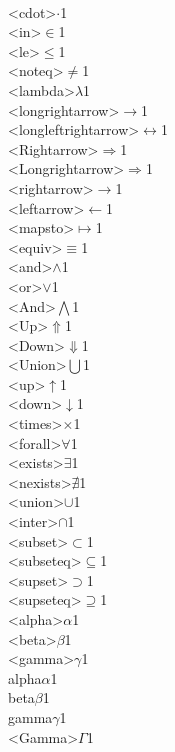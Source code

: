 {  {\\<cdot>}{{$\cdot$}}1
  {\\<in>}{{$\in$}}1
  {\\<le>}{{$\le$}}1
  {\\<noteq>}{{$\ne$}}1
  {\\<lambda>}{{$\lambda$}}1
  {\\<longrightarrow>}{{$\longrightarrow$}}1
  {\\<longleftrightarrow>}{{$\longleftrightarrow$}}1
  {\\<Rightarrow>}{{$\Rightarrow$}}1
  {\\<Longrightarrow>}{{$\Longrightarrow$}}1
  {\\<rightarrow>}{{$\rightarrow$}}1
  {\\<leftarrow>}{{$\leftarrow$}}1
  {\\<mapsto>}{{$\mapsto$}}1
  {\\<equiv>}{{$\equiv$}}1
  {\\<and>}{{$\wedge$}}1
  {\\<or>}{{$\vee$}}1
  {\\<And>}{{$\bigwedge$}}1
  {\\<Up>}{{$\Uparrow$}}1
  {\\<Down>}{{$\Downarrow$}}1
  {\\<Union>}{{$\bigcup$}}1
  {\\<up>}{{$\uparrow$}}1
  {\\<down>}{{$\downarrow$}}1
  {\\<times>}{{$\times$}}1
  {\\<forall>}{{$\forall$}}1
  {\\<exists>}{{$\exists$}}1
  {\\<nexists>}{{$\nexists$}}1
  {\\<union>}{{$\cup$}}1
  {\\<inter>}{{$\cap$}}1
  {\\<subset>}{{$\subset$}}1
  {\\<subseteq>}{{$\subseteq$}}1
  {\\<supset>}{{$\supset$}}1
  {\\<supseteq>}{{$\supseteq$}}1
  {\\<alpha>}{{$\alpha$}}1
  {\\<beta>}{{$\beta$}}1
  {\\<gamma>}{{$\gamma$}}1
  {\\alpha}{{$\alpha$}}1
  {\\beta}{{$\beta$}}1
  {\\gamma}{{$\gamma$}}1
  {\\<Gamma>}{{$\Gamma$}}1
}
